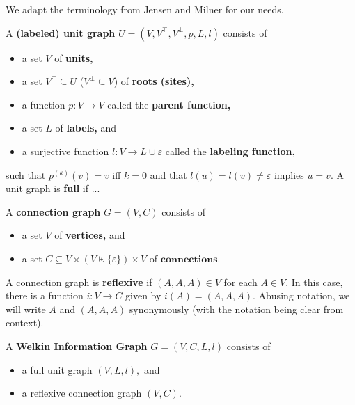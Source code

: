 We adapt the terminology from Jensen and Milner \citep{jensen-milner-bigraphs} for our needs.
\begin{definition}
  A \textbf{(labeled) unit graph} $U = (V, V^{\top}, V^{\bot}, p, L, l)$ consists of
  \begin{itemize}
    \item a set $V$ of \textbf{units,}
    \item a set $V^{\top} \subseteq U$ ($V^{\bot} \subseteq V$) of \textbf{roots (sites),}
    \item a function $p: V \to V$ called the \textbf{parent function,}
    \item a set $L$ of \textbf{labels,} and
    \item a surjective function $l: V \to L \uplus \varepsilon$ called the \textbf{labeling function,}
  \end{itemize}
  such that $p^{(k)}(v) = v$ iff $k = 0$ and that $l(u) = l(v) \neq \varepsilon$ implies $u = v.$ A unit graph is \textbf{full} if ...
\end{definition}

\begin{definition}
  A \textbf{connection graph} $G = (V, C)$ consists of
  \begin{itemize}
    \item a set $V$ of \textbf{vertices,} and
    \item a set $C \subseteq V \times (V \uplus \{\varepsilon\}) \times V$ of $\textbf{connections.}$
  \end{itemize}
        A connection graph is \textbf{reflexive} if $(A, A, A) \in V$ for each $A \in V.$ In this case, there is a function $i: V \to C$ given by $i(A) = (A, A, A).$ Abusing notation, we will write $A$ and $(A, A, A)$ synonymously (with the notation being clear from context).
\end{definition}

\begin{definition} A \textbf{Welkin Information Graph} $G = (V, C, L, l)$ consists of
  \begin{itemize}
    \item a full unit graph $(V, L, l),$ and
    \item a reflexive connection graph $(V, C).$
  \end{itemize}
\end{definition}

